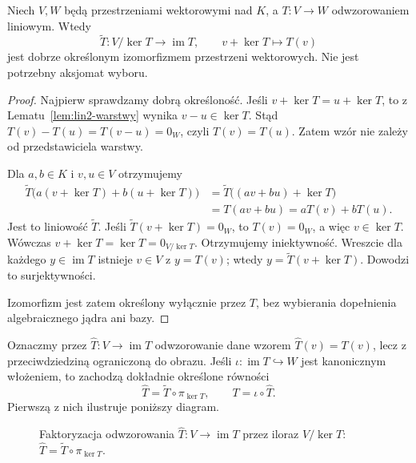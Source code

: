 \begin{twierdzenie}
\label{thm:lin3-pierwsze-izo}
Niech \(V,W\) będą przestrzeniami wektorowymi
nad \(K\), a \(T\colon V\to W\)
odwzorowaniem liniowym. Wtedy
\[
 \widetilde T\colon V/\ker T
 \longrightarrow\operatorname{im}T,\qquad
 v+\ker T\longmapsto T(v)
\]
jest dobrze określonym izomorfizmem
przestrzeni wektorowych. Nie jest potrzebny
aksjomat wyboru.
\end{twierdzenie}
\begin{proof}
Najpierw sprawdzamy dobrą określoność.
Jeśli \(v+\ker T=u+\ker T\), to
z Lematu~\ref{lem:lin2-warstwy}
wynika \(v-u\in\ker T\).
Stąd \(T(v)-T(u)=T(v-u)=0_W\),
czyli \(T(v)=T(u)\).
Zatem wzór nie zależy od przedstawiciela warstwy.

Dla \(a,b\in K\) i \(v,u\in V\) otrzymujemy
\[
 \begin{aligned}
 \widetilde T\bigl(a(v+\ker T)+b(u+\ker T)\bigr)
  &=\widetilde T\bigl((av+bu)+\ker T\bigr)\\
  &=T(av+bu)=aT(v)+bT(u).
 \end{aligned}
\]
Jest to liniowość \(\widetilde T\).
Jeśli \(\widetilde T(v+\ker T)=0_W\),
to \(T(v)=0_W\), a więc \(v\in\ker T\).
Wówczas \(v+\ker T=\ker T=0_{V/\ker T}\).
Otrzymujemy iniektywność.
Wreszcie dla każdego \(y\in\operatorname{im}T\)
istnieje \(v\in V\) z \(y=T(v)\);
wtedy \(y=\widetilde T(v+\ker T)\).
Dowodzi to surjektywności.

Izomorfizm jest zatem określony wyłącznie
przez \(T\), bez wybierania dopełnienia
algebraicznego jądra ani bazy.
\end{proof}

Oznaczmy przez
\(\widehat T\colon V\to\operatorname{im}T\)
odwzorowanie dane wzorem \(\widehat T(v)=T(v)\),
lecz z przeciwdziedziną ograniczoną do obrazu.
Jeśli \(\iota\colon\operatorname{im}T\hookrightarrow W\)
jest kanonicznym włożeniem, to zachodzą
dokładnie określone równości
\[
 \widehat T=\widetilde T\circ\pi_{\ker T},
 \qquad
 T=\iota\circ\widehat T.
\]
Pierwszą z nich ilustruje poniższy diagram.

\begin{figure}[!htbp]
\centering
{}
\caption{Faktoryzacja odwzorowania
\(\widehat T\colon V\to\operatorname{im}T\)
przez iloraz \(V/\ker T\):
\(\widehat T=\widetilde T\circ\pi_{\ker T}\).}
\label{fig:lin3-izo}
\end{figure}

